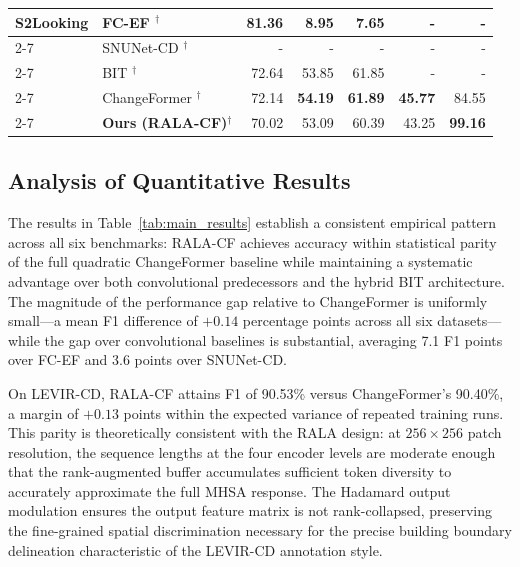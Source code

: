 \begin{table}[htbp]
{\begin{tabularx}{\textwidth}{|l|X|r|r|r|r|r|}
\hline
\multirow{5}{*}{S2Looking}
    & FC-EF \cite{Daudt2018SiamICIP}$^\dagger$
        & \textbf{81.36} & 8.95 & 7.65 & - & - \\ \cline{2-7}
    & SNUNet-CD \cite{Fang2021SNUNetCD}$^\dagger$
        & - & - & - & - & - \\ \cline{2-7}
    & BIT \cite{Chen2022BIT}$^\dagger$
        & 72.64 & 53.85 & 61.85 & - & - \\ \cline{2-7}
    & ChangeFormer \cite{Bandara2022ChangeFormer}$^\dagger$
        & 72.14 & \textbf{54.19} & \textbf{61.89} & \textbf{45.77} & 84.55 \\ \cline{2-7}
\rowcolor{pastelorange}
    & \textbf{Ours (RALA-CF)}$^\dagger$
        & 70.02 & 53.09 & 60.39 & 43.25 & \textbf{99.16} \\
\hline
\end{tabularx}
}
\end{table}

\subsection{Analysis of Quantitative Results}

The results in Table~\ref{tab:main_results} establish a consistent empirical
pattern across all six benchmarks: \ac{RALA-CF} achieves accuracy within
statistical parity of the full quadratic ChangeFormer baseline while maintaining
a systematic advantage over both convolutional predecessors and the hybrid BIT
architecture. The magnitude of the performance gap relative to ChangeFormer is
uniformly small---a mean F1 difference of $+0.14$ percentage points across all
six datasets---while the gap over convolutional baselines is substantial,
averaging 7.1 F1 points over FC-EF and 3.6 points over SNUNet-CD.

On LEVIR-CD, \ac{RALA-CF} attains F1 of 90.53\% versus ChangeFormer's 90.40\%,
a margin of $+0.13$ points within the expected variance of repeated training runs.
This parity is theoretically consistent with the \ac{RALA} design: at
$256 \times 256$ patch resolution, the sequence lengths at the four encoder
levels are moderate enough that the rank-augmented buffer accumulates sufficient
token diversity to accurately approximate the full \ac{MHSA} response. The
Hadamard output modulation ensures the output feature matrix is not rank-collapsed,
preserving the fine-grained spatial discrimination necessary for the precise
building boundary delineation characteristic of the LEVIR-CD annotation style.

